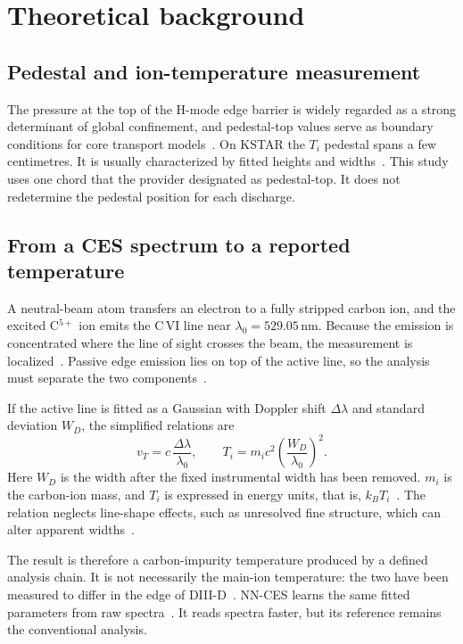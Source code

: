 \section{Theoretical background}
\label{sec:background}

\subsection{Pedestal and ion-temperature measurement}
The pressure at the top of the H-mode edge barrier is widely regarded as a strong determinant of global confinement, and pedestal-top values serve as boundary conditions for core transport models~\citep{Snyder2011FirstPrinciples}. On KSTAR the $T_i$ pedestal spans a few centimetres. It is usually characterized by fitted heights and widths~\citep{Ko2015IonTemperature}. This study uses one chord that the provider designated as pedestal-top. It does not redetermine the pedestal position for each discharge.

\subsection{From a CES spectrum to a reported temperature}
A neutral-beam atom transfers an electron to a fully stripped carbon ion, and the excited C$^{5+}$ ion emits the C\,VI line near $\lambda_0=529.05$\,nm. Because the emission is concentrated where the line of sight crosses the beam, the measurement is localized~\citep{Fonck1984DeterminationPlasma,Isler1994OverviewCharge}. Passive edge emission lies on top of the active line, so the analysis must separate the two components~\citep{Viezzer2011PassiveEdge}.

If the active line is fitted as a Gaussian with Doppler shift $\Delta\lambda$ and standard deviation $W_D$, the simplified relations are
\begin{equation}
 v_T = c\,\frac{\Delta\lambda}{\lambda_0},\qquad T_i = m_i c^2\left(\frac{W_D}{\lambda_0}\right)^2 .
\end{equation}
Here $W_D$ is the width after the fixed instrumental width has been removed. $m_i$ is the carbon-ion mass, and $T_i$ is expressed in energy units, that is, $k_B T_i$~\citep{Lee2026NeuralNetworkbased}. The relation neglects line-shape effects, such as unresolved fine structure, which can alter apparent widths~\citep{Fonck1984DeterminationPlasma}.

The result is therefore a carbon-impurity temperature produced by a defined analysis chain. It is not necessarily the main-ion temperature: the two have been measured to differ in the edge of DIII-D~\citep{Haskey2018MainIon}. NN-CES learns the same fitted parameters from raw spectra~\citep{Lee2026NeuralNetworkbased}. It reads spectra faster, but its reference remains the conventional analysis.

